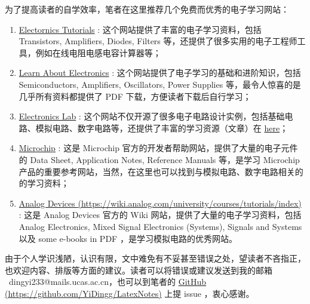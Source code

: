 \documentclass[UTF8]{report}
\begin{document}
\begin{cnabstract}
为了提高读者的自学效率，笔者在这里推荐几个免费而优秀的电子学习网站：
\begin{enumerate}
\item \href{https://www.electronics-tutorials.ws/}{Electornics Tutorials} : 这个网站提供了丰富的电子学习资料，包括 Transistors, Amplifiers, Diodes, Filters 等，还提供了很多实用的电子工程师工具，例如在线电阻电感电容计算器等；
\item \href{https://www.learnabout-electronics.org/}{Learn About Electronics} : 这个网站提供了电子学习的基础和进阶知识，包括 Semiconductors, Amplifiers, Oscillators, Power Supplies 等，最令人惊喜的是几乎所有资料都提供了 PDF 下载，方便读者下载后自行学习；
\item \href{https://www.electronics-lab.com}{Electronics Lab} : 这个网站不仅开源了很多电子电路设计实例，包括基础电路、模拟电路、数字电路等，还提供了丰富的学习资源（文章）在 \href{https://www.electronics-lab.com/articles/}{here}；
\item \href{https://developerhelp.microchip.com/}{Microchip} : 这是 Microchip 官方的开发者帮助网站，提供了大量的电子元件的 Data Sheet, Application Notes, Reference Manuals 等，是学习 Microchip 产品的重要参考网站，当然，在这里也可以找到与模拟电路、数字电路相关的的学习资料；
\item \href{https://wiki.analog.com/university/courses/tutorials/index}{Analog Devices {\color{black}(https://wiki.analog.com/university/courses/tutorials/index)}} : 这是 Analog Devices 官方的 Wiki 网站，提供了大量的电子学习资料，包括 Analog Electronics, Mixed Signal Electronics (Systems), Signals and Systems 以及 some e-books in PDF ，是学习模拟电路的优秀网站。
\end{enumerate}

由于个人学识浅陋，认识有限，文中难免有不妥甚至错误之处，望读者不吝指正，也欢迎内容、排版等方面的建议。读者可以将错误或建议发送到我的邮箱 {\color{blue}\ dingyi233@mails.ucas.ac.cn}，也可以到笔者的 \href{https://github.com/YiDingg/LatexNotes}{GitHub (https://github.com/YiDingg/LatexNotes)} 上提 issue ，衷心感谢。

\end{cnabstract}
\end{document}

